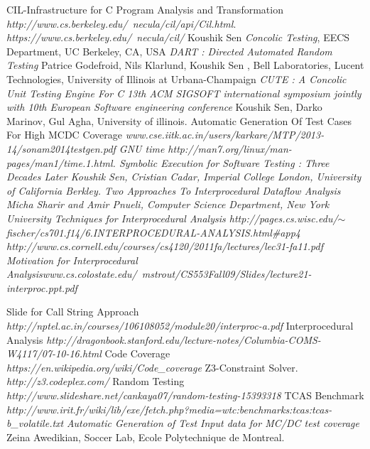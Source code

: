 \documentclass[12pt,oneside]{book}
\begin{document}
\begin{thebibliography}{}

   CIL-Infrastructure for C Program Analysis and Transformation  {\em http://www.cs.berkeley.edu/~necula/cil/api/Cil.html}. 
   \textit{https://www.cs.berkeley.edu/~necula/cil/}
   Koushik Sen \textit {Concolic Testing}, EECS Department, UC Berkeley, CA, USA
   \textit{DART : Directed Automated Random Testing} Patrice Godefroid, Nils Klarlund, Koushik Sen , Bell Laboratories, Lucent Technologies, University of Illinois at Urbana-Champaign
   \textit{CUTE : A Concolic Unit Testing Engine For C 13th ACM SIGSOFT international symposium jointly with 10th European Software engineering conference} Koushik Sen, Darko Marinov, Gul Agha, University of illinois.
   Automatic Generation Of Test Cases For High MCDC Coverage \em{www.cse.iitk.ac.in/users/karkare/MTP/2013-14/sonam2014testgen.pdf}
   GNU time {\em http://man7.org/linux/man-pages/man1/time.1.html}.
   \em{Symbolic Execution for Software Testing : Three Decades Later} Koushik Sen, Cristian Cadar, Imperial College London, University of California Berkley.
   \textit{Two Approaches To Interprocedural Dataflow Analysis} Micha Sharir and Amir Pnueli, Computer Science Department, New York University
   Techniques for Interprocedural Analysis \textit{http://pages.cs.wisc.edu/$\sim$fischer/cs701.f14/6.INTERPROCEDURAL-ANALYSIS.html\#app4}\\
  \textit{http://www.cs.cornell.edu/courses/cs4120/2011fa/lectures/lec31-fa11.pdf}
   Motivation for Interprocedural Analysis\textit{www.cs.colostate.edu/~mstrout/CS553Fall09/Slides/lecture21-interproc.ppt.pdf}
  
  \newpage
   Slide for Call String Approach \textit{http://nptel.ac.in/courses/106108052/module20/interproc-a.pdf}
   Interprocedural Analysis \textit{http://dragonbook.stanford.edu/lecture-notes/Columbia-COMS-W4117/07-10-16.html} 
   Code Coverage \textit{https://en.wikipedia.org/wiki/Code\_coverage}
   Z3-Constraint Solver. \textit{http://z3.codeplex.com/}
   Random Testing \textit{http://www.slideshare.net/cankaya07/random-testing-15393318}
   TCAS Benchmark \textit{http://www.irit.fr/wiki/lib/exe/fetch.php?media=wtc:benchmarks:tcas:tcas-b\_volatile.txt}
   \textit{Automatic Generation of Test Input data for MC/DC test coverage} Zeina Awedikian, Soccer Lab, Ecole Polytechnique de Montreal.
  
  
  
  \end{thebibliography}
  
\end{document}
